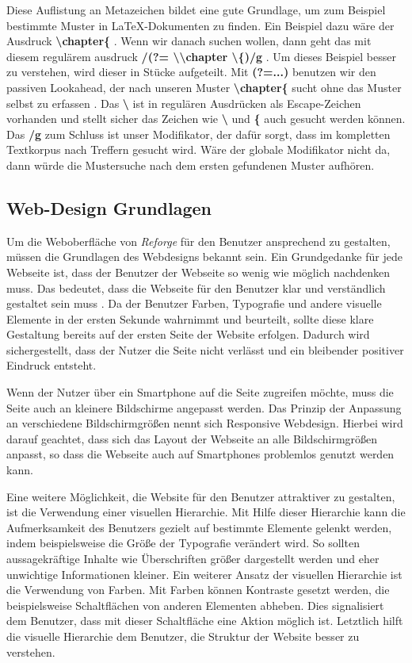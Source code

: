 Diese Auflistung an Metazeichen bildet eine gute Grundlage, um zum Beispiel bestimmte Muster in LaTeX-Dokumenten zu finden. Ein Beispiel dazu wäre der Ausdruck \textbf{\textbackslash chapter\{ }. Wenn wir danach suchen wollen, dann geht das mit diesem regulärem ausdruck \textbf{/(?= \textbackslash \textbackslash chapter \textbackslash \{)/g }. Um dieses Beispiel besser zu verstehen, wird dieser in Stücke aufgeteilt. Mit \textbf{(?=...)} benutzen wir den passiven Lookahead, der nach unseren Muster \textbf{\textbackslash chapter\{} sucht ohne das Muster selbst zu erfassen \cite[S.62]{friedl2009regulare}.
Das \textbf{\textbackslash}  ist in regulären Ausdrücken als Escape-Zeichen vorhanden und stellt sicher das Zeichen wie \textbf{\textbackslash} und \textbf{\{} auch gesucht werden können. Das \textbf{/g} zum Schluss ist unser Modifikator, der dafür sorgt, dass im kompletten Textkorpus nach Treffern gesucht wird. Wäre der globale Modifikator nicht da, dann würde die Mustersuche nach dem ersten gefundenen Muster aufhören.

\subsection{Web-Design Grundlagen}
Um die Weboberfläche von \textit{Reforge} für den Benutzer ansprechend zu gestalten, müssen die Grundlagen des Webdesigns bekannt sein. Ein Grundgedanke für jede Webseite ist, dass der Benutzer der Webseite so wenig wie möglich nachdenken muss. Das bedeutet, dass die Webseite für den Benutzer klar und verständlich gestaltet sein muss \cite{krug2018don}. Da der Benutzer Farben, Typografie und andere visuelle Elemente in der ersten Sekunde wahrnimmt und beurteilt, sollte diese klare Gestaltung bereits auf der ersten Seite der Website erfolgen. Dadurch wird sichergestellt, dass der Nutzer die Seite nicht verlässt und ein bleibender positiver Eindruck entsteht.

Wenn der Nutzer über ein Smartphone auf die Seite zugreifen möchte, muss die Seite auch an kleinere Bildschirme angepasst werden. Das Prinzip der Anpassung an verschiedene Bildschirmgrößen nennt sich Responsive Webdesign. Hierbei wird darauf geachtet, dass sich das Layout der Webseite an alle Bildschirmgrößen anpasst, so dass die Webseite auch auf Smartphones problemlos genutzt werden kann. \cite[S.51 ff]{Naumann2024}

Eine weitere Möglichkeit, die Website für den Benutzer attraktiver zu gestalten, ist die Verwendung einer visuellen Hierarchie. Mit Hilfe dieser Hierarchie kann die Aufmerksamkeit des Benutzers gezielt auf bestimmte Elemente gelenkt werden, indem beispielsweise die Größe der Typografie verändert wird. So sollten aussagekräftige Inhalte wie Überschriften größer dargestellt werden und eher unwichtige Informationen kleiner. Ein weiterer Ansatz der visuellen Hierarchie ist die Verwendung von Farben. Mit Farben können Kontraste gesetzt werden, die beispielsweise Schaltflächen von anderen Elementen abheben. Dies signalisiert dem Benutzer, dass mit dieser Schaltfläche eine Aktion möglich ist. Letztlich hilft die visuelle Hierarchie dem Benutzer, die Struktur der Website besser zu verstehen. \cite[S.54 ff.]{Naumann2024}
 
